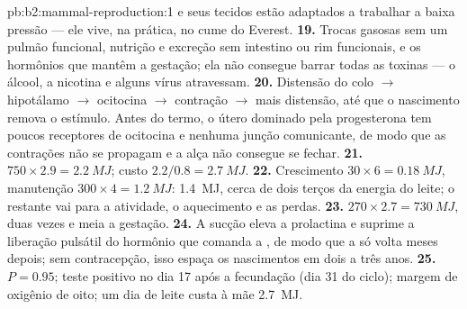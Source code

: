 \begin{solution}{pb:b2:mammal-reproduction:1}
e seus tecidos estão adaptados a trabalhar a baixa pressão --- ele
vive, na prática, no cume do Everest.
\textbf{19.} Trocas gasosas sem um pulmão funcional, nutrição e
excreção sem intestino ou rim funcionais, e os hormônios que mantêm a
gestação; ela não consegue barrar todas as toxinas --- o álcool, a
nicotina e alguns vírus atravessam.
\textbf{20.} Distensão do colo $\to$ hipotálamo $\to$ ocitocina $\to$
contração $\to$ mais distensão, até que o nascimento remova o estímulo.
Antes do termo, o útero dominado pela progesterona tem poucos
receptores de ocitocina e nenhuma junção comunicante, de modo que as
contrações não se propagam e a alça não consegue se fechar.
\textbf{21.} $750\times 2.9 = \qty{2.2}{MJ}$; custo $2.2/0.8 =
\qty{2.7}{MJ}$.
\textbf{22.} Crescimento $30\times 6 = \qty{0.18}{MJ}$, manutenção
$300\times 4 = \qty{1.2}{MJ}$: \qty{1.4}{MJ}, cerca de dois terços da
energia do leite; o restante vai para a atividade, o aquecimento e as
perdas.
\textbf{23.} $270\times 2.7 = \qty{730}{MJ}$, duas vezes e meia a
gestação.
\textbf{24.} A sucção eleva a prolactina e suprime a liberação
pulsátil do hormônio que comanda a , de modo que a  só
volta meses depois; sem contracepção, isso espaça os nascimentos em
dois a três anos.
\textbf{25.} $P = 0.95$; teste positivo no dia 17 após a fecundação
(dia 31 do ciclo); margem de oxigênio de oito; um dia de leite custa à
mãe \qty{2.7}{MJ}.
\end{solution}
